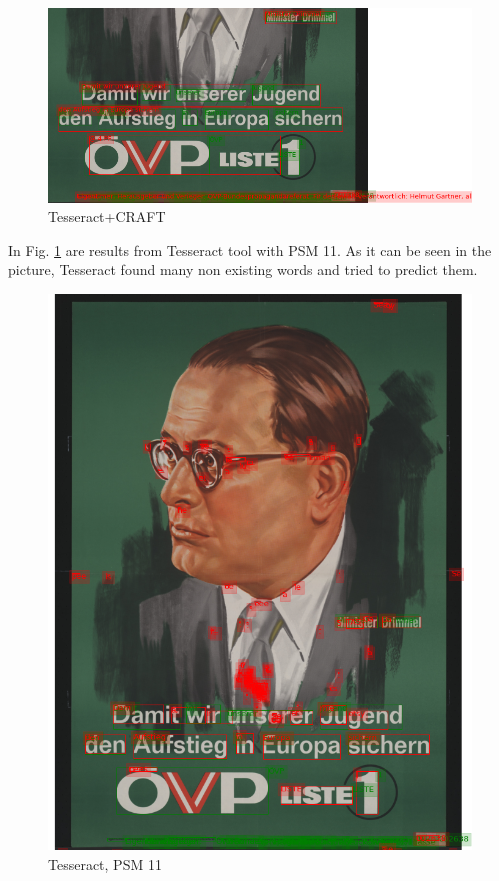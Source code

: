 \begin{figure}[hbtp!]
    \centering
    \includegraphics[scale=0.36]{obrazky/plakaty/result_carfttesseract_vienna1_split_special_snesitive-91.png}
    \caption{Tesseract+CRAFT}
    \label{Im1:ex:craft}
\end{figure}

In Fig. \ref{Im1:ex:craft} are results from Tesseract tool with PSM 11. As it can be seen in the picture, Tesseract found many non existing words and tried to predict them.

\begin{figure}[hbtp!]  
      \centering
    \includegraphics[scale=0.36]{obrazky/plakaty/result_tesseract_vienna1_split_psm11-91.png}
    \caption{Tesseract, PSM 11}
    \label{Im1:ex:tess11}
\end{figure}

